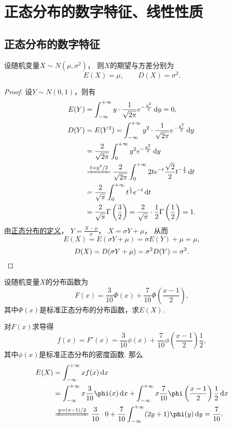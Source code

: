 \section{正态分布的数字特征、线性性质}
\subsection{正态分布的数字特征}
\begin{theorem}\label{theorem:正态分布与自然指数分布族.正态分布的数字特征}
设随机变量\(X \sim N(\mu,\sigma^2)\)，
则\(X\)的期望与方差分别为\[
	E(X) = \mu,
	\qquad
	D(X) = \sigma^2.
\]
\begin{proof}
设\(Y \sim N(0,1)\)，则有\begin{align*}
	E(Y) &= \int_{-\infty}^{+\infty} y \cdot \frac{1}{\sqrt{2\pi}} e^{-\frac{y^2}{2}} \dd{y} = 0, \\
	D(Y) &= E(Y^2)
	= \int_{-\infty}^{+\infty} y^2 \cdot \frac{1}{\sqrt{2\pi}} e^{-\frac{y^2}{2}} \dd{y} \\
	&= \frac{2}{\sqrt{2\pi}} \int_0^{+\infty} y^2 e^{-\frac{y^2}{2}} \dd{y} \\
	&\xlongequal{t=y^2/2} \frac{2}{\sqrt{2\pi}} \int_0^{+\infty} 2 t e^{-t} \frac{\sqrt{2}}{2} t^{-\frac{1}{2}} \dd{t} \\
	&=\frac{2}{\sqrt{\pi}} \int_0^{+\infty} t^{\frac{1}{2}} e^{-t} \dd{t} \\
	&= \frac{2}{\sqrt{\pi}} \Gamma\left(\frac{3}{2}\right)
	= \frac{2}{\sqrt{\pi}} \cdot \frac{1}{2} \Gamma\left(\frac{1}{2}\right)
	= 1.
\end{align*}
由\hyperref[definition:正态分布.正态分布的定义]{正态分布的定义}，
\(Y = \frac{X-\mu}{\sigma}\)，
\(X = \sigma Y + \mu\)，
从而\[
	E(X) = E(\sigma Y + \mu) = \sigma E(Y) + \mu = \mu,
\]\[
	D(X) = D(\sigma Y + \mu) = \sigma^2 D(Y) = \sigma^2.
	\qedhere
\]
\end{proof}
\end{theorem}

\begin{example}
设随机变量\(X\)的分布函数为\[
	F(x) = \frac{3}{10} \Phi(x) + \frac{7}{10} \Phi\left(\frac{x-1}{2}\right),
\]
其中\(\Phi(x)\)是标准正态分布的分布函数，求\(E(X)\).
\begin{solution}
对\(F(x)\)求导得\[
	f(x) = F'(x)
	= \frac{3}{10} \phi(x)
		+ \frac{7}{10} \phi\left(\frac{x-1}{2}\right) \frac{1}{2},
\]
其中\(\phi(x)\)是标准正态分布的密度函数.
那么\begin{align*}
	E(X) &= \int_{-\infty}^{+\infty} x f(x) \dd{x} \\
	&= \int_{-\infty}^{+\infty} x \frac{3}{10} \phi(x) \dd{x}
	+ \int_{-\infty}^{+\infty} x \frac{7}{10} \phi\left(\frac{x-1}{2}\right) \frac{1}{2} \dd{x} \\
	&\xlongequal{y=(x-1)/2} \frac{3}{10} \cdot 0
	+ \frac{7}{10} \int_{-\infty}^{+\infty} (2y+1) \phi(y) \dd{y}
	= \frac{7}{10}.
\end{align*}
\end{solution}
\end{example}

